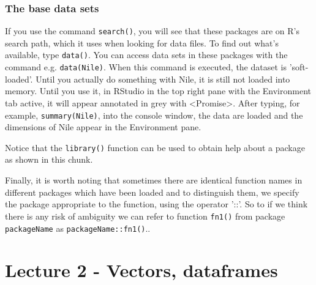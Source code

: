 \documentclass[titlepage]{book}\usepackage{knitr}
\begin{document}
\subsection{The base data sets}

If you use the command \texttt{search()}, you will see that these packages are on R's search path, which it uses when looking for data files. To find out what's available, type \texttt{data()}. You can access data sets in these packages with the command e.g. \texttt{data(Nile)}. When this command is executed, the dataset is 'soft-loaded'.  Until you actually do something with Nile, it is still not loaded into memory. Until you use it, in RStudio in the top right pane with the Environment tab active, it will appear annotated in grey with <Promise>. After typing, for example, \texttt{summary(Nile)}, into the console window, the data are loaded and the dimensions of Nile appear in the Environment pane.

\begin{knitrout}
\color{fgcolor}\begin{kframe}
\begin{alltt}
\hlstd{()}
\hlstd{(}
\end{alltt}
\end{kframe}
\end{knitrout}

Notice that the \texttt{library()} function can be used to obtain help about a package as shown in this chunk.

Finally, it is worth noting that sometimes there are identical function names in different packages which have been loaded and to distinguish them, we  specify the package appropriate to the function, using the operator '::'.  So to if we think there is any risk of ambiguity we can refer to function \texttt{fn1()} from package \texttt{packageName} as \texttt{packageName::fn1()}..






\chapter{Lecture 2 - Vectors, dataframes}
\end{document}
